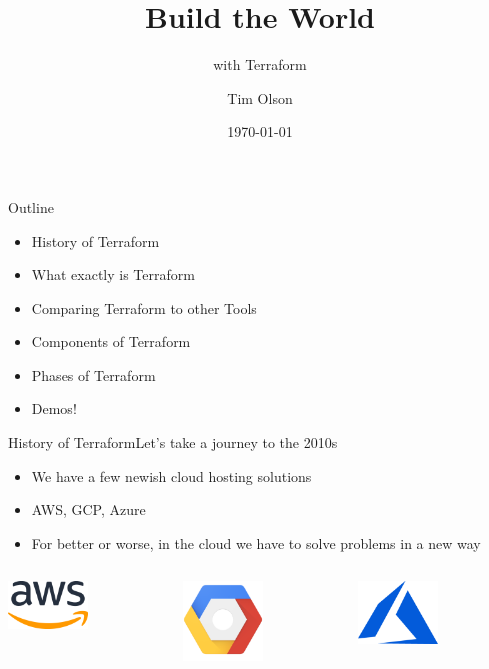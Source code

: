\documentclass{beamer}
\title{Build the World}
\subtitle{with Terraform}
\author{Tim Olson}
\date{\today}
\begin{document}
\begin{frame}
\titlepage
\end{frame}


\begin{frame}{Outline}

\begin{itemize}
    \item History of Terraform
    \item What exactly is Terraform
    \item Comparing Terraform to other Tools
    \item Components of Terraform
    \item Phases of Terraform
    \item Demos!
\end{itemize}

\end{frame}


\begin{frame}{History of Terraform}{Let's take a journey to the 2010s}
\begin{itemize}
    \item We have a few newish cloud hosting solutions
    \item AWS, GCP, Azure
    \item For better or worse, in the cloud we have to solve problems in a new way
\end{itemize}

\begin{columns}
    \begin{column}{0.1\textwidth}
        \includegraphics[width=80px,keepaspectratio]{./assets/aws.png}
    \end{column}
    \begin{column}{0.1\textwidth}
        \includegraphics[width=80px,keepaspectratio]{./assets/gcp.png}
    \end{column}
    \begin{column}{0.1\textwidth}
        \includegraphics[width=80px,keepaspectratio]{./assets/azure.png}
    \end{column}
\end{columns}

\end{frame}
\end{document}
